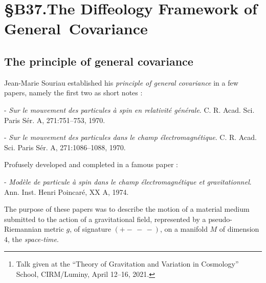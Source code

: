 
\chapter*{\S B37.The Diffeology Framework of \hbox{General Covariance}}
\setcounter{footnote}{0}

\vspace{-1em}
\begin{abstract}
  In this lecture%
  \footnote{Talk given at the ``Theory of Gravitation and Variation in Cosmology'' School, CIRM/Luminy, April 12--16, 2021.}
  I will present the principle of general covariance,
  introduced by J.-M. Souriau in the 1970s,
  as the active version of the principle of general relativity.
  I will show how we can include it in the formal diffeology framework.
\end{abstract}

\vspace{-1em}
\section{The principle of general covariance}

Jean-Marie Souriau established his \emph{principle of general covariance} in a few papers,
namely the first two as short notes \cite{Sou70a,Sou70b}:

- {\em Sur le mouvement des particules à spin en relativité générale}.
C. R. Acad. Sci. Paris Sér. A, 271:751–753, 1970.

- {\em Sur le mouvement des particules dans le champ électromagnétique}.
C. R. Acad. Sci. Paris Sér. A, 271:1086–1088, 1970.

Profusely developed and completed in a famous paper \cite{Sou74}:

- {\em Modèle de particule à spin dans le champ électromagnétique et gravitationnel}.
Ann. Inst. Henri Poincaré, XX A, 1974.

The purpose of these papers was to describe the motion of a material medium submitted to the action of a gravitational field,
represented by a pseudo-Riemannian metric $g$,
of signature $(+ -\, -\, -)$,
on a manifold $M$ of dimension $4$,
the \emph{space-time}.

